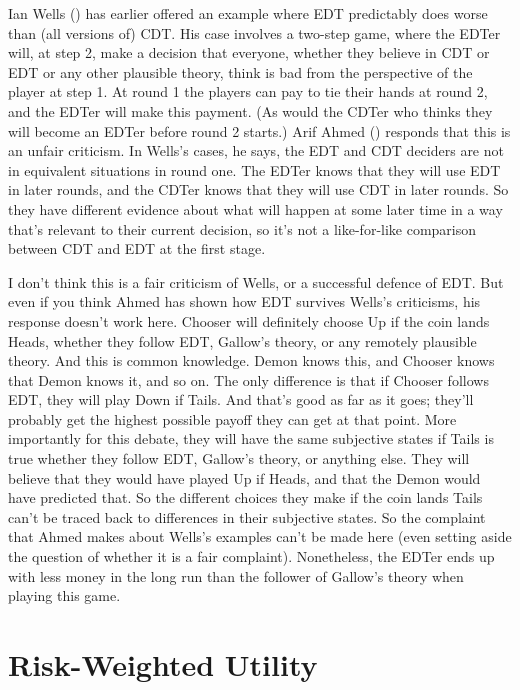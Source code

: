 \documentclass[
  12pt,
  letterpaper,
  DIV=11,
  numbers=noendperiod]{scrreprt}
\begin{document}
Ian Wells () has earlier offered an
example where EDT predictably does worse than (all versions of) CDT. His
case involves a two-step game, where the EDTer will, at step 2, make a
decision that everyone, whether they believe in CDT or EDT or any other
plausible theory, think is bad from the perspective of the player at
step 1. At round 1 the players can pay to tie their hands at round 2,
and the EDTer will make this payment. (As would the CDTer who thinks
they will become an EDTer before round 2 starts.) Arif Ahmed
() responds that this is an unfair
criticism. In Wells's cases, he says, the EDT and CDT deciders are not
in equivalent situations in round one. The EDTer knows that they will
use EDT in later rounds, and the CDTer knows that they will use CDT in
later rounds. So they have different evidence about what will happen at
some later time in a way that's relevant to their current decision, so
it's not a like-for-like comparison between CDT and EDT at the first
stage.

I don't think this is a fair criticism of Wells, or a successful defence
of EDT. But even if you think Ahmed has shown how EDT survives Wells's
criticisms, his response doesn't work here. Chooser will definitely
choose Up if the coin lands Heads, whether they follow EDT, Gallow's
theory, or any remotely plausible theory. And this is common knowledge.
Demon knows this, and Chooser knows that Demon knows it, and so on. The
only difference is that if Chooser follows EDT, they will play Down if
Tails. And that's good as far as it goes; they'll probably get the
highest possible payoff they can get at that point. More importantly for
this debate, they will have the same subjective states if Tails is true
whether they follow EDT, Gallow's theory, or anything else. They will
believe that they would have played Up if Heads, and that the Demon
would have predicted that. So the different choices they make if the
coin lands Tails can't be traced back to differences in their subjective
states. So the complaint that Ahmed makes about Wells's examples can't
be made here (even setting aside the question of whether it is a fair
complaint). Nonetheless, the EDTer ends up with less money in the long
run than the follower of Gallow's theory when playing this game.

\chapter{Risk-Weighted Utility}\label{sec-buchak}
\end{document}
